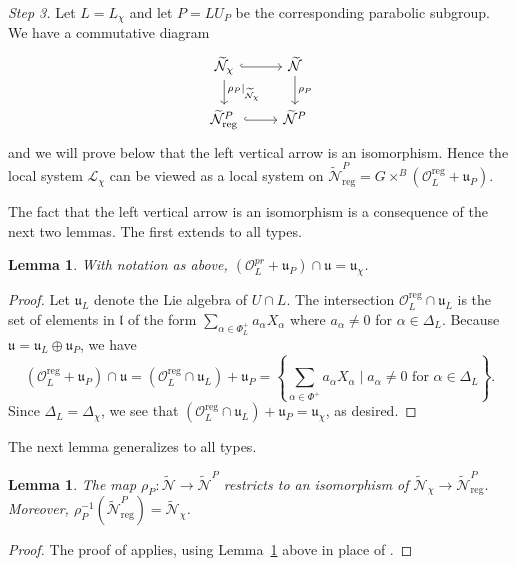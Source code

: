 \documentclass[reqno,11pt]{amsart}
\newtheorem{Lem}[Thm]{Lemma}
\theoremstyle{remark}
\theoremstyle{remark}
\theoremstyle{definition}
\theoremstyle{definition}
\theoremstyle{definition}
\numberwithin{equation}{section}
\newcommand{\fl}{{\mathfrak l}}
\newcommand{\fu}{{\mathfrak u}}
\newcommand{\ga}{\alpha}
\newcommand{\cl}{\mathcal{L}}
\newcommand{\cn}{\mathcal{N}}
\newcommand{\co}{\mathcal{O}}
\renewcommand{\tilde}{\widetilde}
\newcommand{\reg}{\mathrm{reg}}
\begin{document}
\medskip

{\em Step 3.} Let $L = L_{\chi}$ and let $P = L U_P$ be the corresponding parabolic subgroup.  We have a commutative
diagram
$$
\begin{tikzcd}
 \tilde{\cn}_{\chi}  \arrow[hook, r] \arrow[d,  "\rho_P|_{\tilde{\cn}_\chi}"] & 
\tilde{\cn} \arrow[d,  "\rho_P"] \\
 \tilde{\cn}^P_{\reg} \arrow [hook, r] &
\tilde{\cn}^P 
\end{tikzcd}
$$
and we will prove below that the left vertical arrow is an isomorphism.  Hence the local system $\cl_{\chi}$ can be viewed as a local
system on $ \tilde{\cn}^P_{\reg}= G\times^B \left( \co_L^{\reg} +\fu_P \right)$.  

The fact that the left vertical arrow is an isomorphism is a consequence of the next two lemmas. The first extends \cite[Lemma 4.4]{GPR23} to all types.

\begin{Lem} \label{l:intersection}
With notation as above, $(\co_L^{pr} + \fu_P) \cap \fu = \fu_{\chi}$.
\end{Lem}

\begin{proof}
Let $\fu_L$ denote the Lie algebra of $U\cap L$. 
The intersection $\co_L^{\reg} \cap \fu_L$ is the set of elements in $\fl$ of the form $ \sum_{\ga \in \Phi^+_L} a_{\alpha} X_{\alpha}$ where $a_{\ga} \neq 0$ for $\ga \in \Delta_L$. Because $\fu = \fu_L \oplus \fu_P$, we have
$$
(\co_L^{\reg} + \fu_P) \cap \fu = (\co_L^{\reg} \cap \fu_L) + \fu_P = \left\{  \sum_{\ga \in \Phi^+} a_{\alpha} X_{\alpha} \mid a_{\ga} \neq 0 \mbox{ for }\ga \in \Delta_L \right\}.
$$
Since $\Delta_L = \Delta_{\chi}$, we see that $(\co_L^{\reg} \cap \fu_L) + \fu_P = \fu_{\chi}$, as desired.
\end{proof}


The next lemma generalizes \cite[Prop.~4.5]{GPR23} to all types.
\begin{Lem} \label{l:openisom}
The map $\rho_P: \tilde{\cn} \to \tilde{\cn}^P$ restricts to an isomorphism of $\tilde{\cn}_{\chi} \to \tilde{\cn}^P_{\reg}$.  Moreover,
$\rho_P^{-1}(\tilde{\cn}^P_{\reg}) = \tilde{\cn}_{\chi}$.
\end{Lem}

\begin{proof}
The proof of \cite[Prop.~4.5]{GPR23} applies, using Lemma~\ref{l:intersection} above in place of \cite[Lemma 4.4]{GPR23}.
\end{proof}
\end{document}
